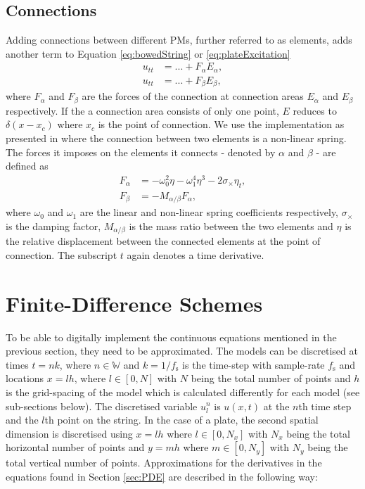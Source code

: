 \documentclass{article}
\begin{document}
\subsection{Connections}\label{sec:connections}
Adding connections between different PMs, further referred to as elements, adds another term to Equation \eqref{eq:bowedString} or \eqref{eq:plateExcitation}
\begin{align}
    u_{tt} &= ... + F_\alpha E_\alpha, \\
    u_{tt} &= ... + F_\beta E_\beta,
\end{align}
where $F_\alpha$ and $F_\beta$ are the forces of the connection at connection areas $E_\alpha$ and $E_\beta$ respectively. If the a connection area consists of only one point, $E$ reduces to $\delta(x-x_c)$ where $x_c$ is the point of connection. We use the implementation as presented in \cite{Bilbao2009:ModularPercussion} where the connection between two elements is a non-linear spring. The forces it imposes on the elements it connects - denoted by $\alpha$ and $\beta$ - are defined as
\begin{align}
    F_\alpha &= -\omega_0^2\eta - \omega_1^4\eta^3 - 2\sigma_\times\eta_t,\\
    F_\beta &= -M_{\alpha/\beta}F_\alpha,
\end{align}
where $\omega_0$ and $\omega_1$ are the linear and non-linear spring coefficients respectively, $\sigma_\times$ is the damping factor, $M_{\alpha/\beta}$ is the mass ratio between the two elements and $\eta$ is the relative displacement between the connected elements at the point of connection. The subscript $t$ again denotes a time derivative.


\section{Finite-Difference Schemes}\label{sec:FDS}
To be able to digitally implement the continuous equations mentioned in the previous section, they need to be approximated. The models can be discretised at times $t = nk$, where $n \in \mathbb{W}$ and $k = 1 / f_\text{s}$ is the time-step with sample-rate $f_\text{s}$ and locations $x = lh$, where $l \in [0,N]$ with $N$ being the total number of points and $h$ is the grid-spacing of the model which is calculated differently for each model (see sub-sections below). The discretised variable $u_l^n$ is $u(x,t)$ at the $n$th time step and the $l$th point on the string. In the case of a plate, the second spatial dimension is discretised using $x = lh$ where $l \in [0,N_x]$ with $N_x$ being the total horizontal number of points and $y = mh$ where $m \in [0,N_y]$ with $N_y$ being the total vertical number of points. 
Approximations for the derivatives in the equations found in Section \ref{sec:PDE} are described in the following way: 
\end{document}
